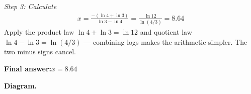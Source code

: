 \documentclass[11pt]{article}
\begin{document}
\textit{Step 3: Calculate}
\[\begin{gathered}
x = \frac{-(\ln 4 + \ln 3)}{\ln 3 - \ln 4} = \frac{\ln 12}{\ln(4/3)} = 8.64
\end{gathered}\]
Apply the product law \( \ln 4 + \ln 3 = \ln 12 \) and quotient law \( \ln 4 - \ln 3 = \ln(4/3) \) --- combining logs makes the arithmetic simpler. The two minus signs cancel.

\begin{answerbox}
\textbf{Final answer:}\quad \(\displaystyle x = 8.64\)
\end{answerbox}
\textbf{Diagram.}

\begin{center}
\end{center}
\end{document}
